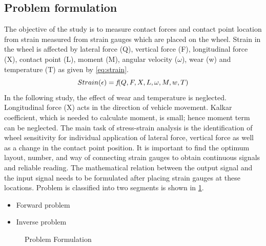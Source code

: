 \documentclass[]{interact}
\theoremstyle{plain}%
\theoremstyle{definition}
\theoremstyle{remark}
\begin{document}
\subsection{Problem formulation}
The objective of the study is to measure contact forces and contact point location from strain measured from strain gauges which are placed on the wheel. Strain in the wheel is affected by lateral force (Q), vertical force (F), longitudinal force (X), contact point (L), moment (M), angular velocity ($\omega$), wear (w) and temperature (T) as given by \cref{eq:strain}.
\begin{equation}
Strain(\epsilon) = \emph{f}(Q,F,X,L,\omega,M,w,T) \label{eq:strain}
\end{equation}
In the following study, the effect of wear and temperature is neglected. Longitudinal force (X) acts in the direction of vehicle movement. Kalkar coefficient, which is needed to calculate moment, is small; hence moment term can be neglected. The main task of stress-strain analysis is the identification of wheel sensitivity for individual application of lateral force, vertical force as well as a change in the contact point position. It is important to find the optimum layout, number, and way of connecting strain gauges to obtain continuous signals and reliable reading. The mathematical relation between the output signal and the input signal needs to be formulated after placing strain gauges at these locations.
Problem is classified into two segments is shown in \cref{fig:formulation}.
\begin{itemize}
\item Forward problem
\item Inverse problem
\end{itemize}


\begin{figure}
\centering
{}
\caption{Problem Formulation} \label{fig:formulation}
\end{figure}
\end{document}
